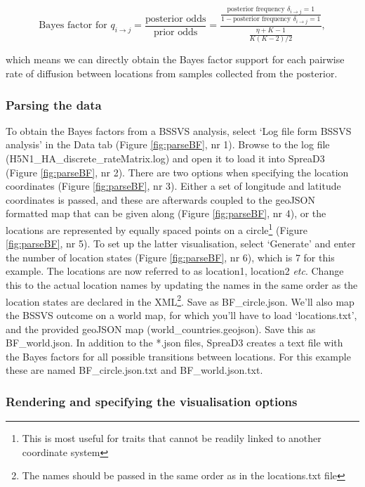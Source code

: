 \documentclass[english]{paper}
\def \spreadname {SpreaD3}
\begin{document}
$$ \text{Bayes factor for $q_{i{\rightarrow}j}$} = \frac{ \text{posterior odds}}{\text{prior odds}} = \frac{\frac{\text{posterior frequency $\delta_{i{\rightarrow}j} = 1$}}{1 - \text{posterior frequency $\delta_{i{\rightarrow}j} = 1$}}}{\frac{\eta + K - 1}{K(K-2)/2}},$$

\noindent
which means we can directly obtain the Bayes factor support for each pairwise rate of diffusion between locations from samples collected from the posterior. 

\subsubsection{Parsing the data}

To obtain the Bayes factors from a BSSVS analysis, select `Log file form BSSVS analysis' in the Data tab (Figure \ref{fig:parseBF}, nr 1).
Browse to the log file (H5N1\_HA\_discrete\_rateMatrix.log) and open it to load it into {\spreadname} (Figure \ref{fig:parseBF}, nr 2).
There are two options when specifying the location coordinates (Figure \ref{fig:parseBF}, nr 3).
Either a set of longitude and latitude coordinates is passed, and these are afterwards coupled to the geoJSON formatted map that can be given along (Figure \ref{fig:parseBF}, nr 4), or the locations are represented by equally spaced points on a circle\footnote{This is most useful for traits that cannot be readily linked to another coordinate system} (Figure \ref{fig:parseBF}, nr 5).
To set up the latter visualisation, select `Generate' and enter the number of location states (Figure \ref{fig:parseBF}, nr 6), which is 7 for this example.
The locations are now referred to as location1, location2 \textit{etc}. 
Change this to the actual location names by updating the names in the same order as the location states are declared in the XML\footnote{The names should be passed in the same order as in the locations.txt file}.
Save as BF\_circle.json.
We'll also map the BSSVS outcome on a world map, for which you'll have to load `locations.txt', and the provided geoJSON map (world\_countries.geojson).
Save this as BF\_world.json.
In addition to the *.json files, {\spreadname} creates a text file with the Bayes factors for all possible transitions between locations. 
For this example these are named BF\_circle.json.txt and BF\_world.json.txt.

\subsubsection{Rendering and specifying the visualisation options}
\end{document}
